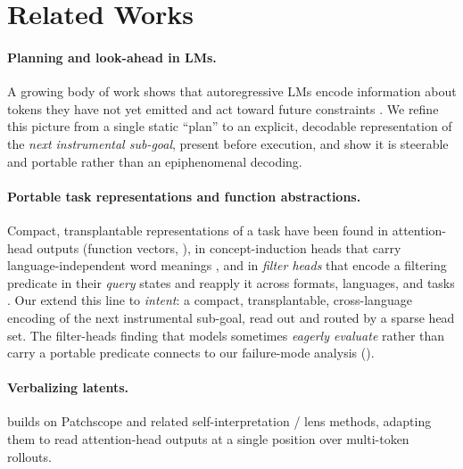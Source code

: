\section{Related Works}
\label{sec:related}

\paragraph{Planning and look-ahead in LMs.} A growing body of work shows that autoregressive LMs
encode information about tokens they have not yet emitted and act toward future constraints
\citep{pal2023futurelens, lindsey2025biology}. We refine this picture from a single static ``plan'' to
an explicit, decodable representation of the \emph{next instrumental sub-goal}, present before
execution, and show it is steerable and portable rather than an epiphenomenal decoding.

\paragraph{Portable task representations and function abstractions.} Compact, transplantable
representations of a task have been found in attention-head outputs (function vectors,
\citealp{todd2024function}), in concept-induction heads that carry language-independent word
meanings \citep{feucht2025dual}, and in \emph{filter heads} that encode a filtering predicate in
their \emph{query} states and reapply it across formats, languages, and tasks
\citep{sensharma2025filterheads}. Our \goalheads extend this line to \emph{intent}: a compact,
transplantable, cross-language encoding of the next instrumental sub-goal, read out and routed by a
sparse head set. The filter-heads finding that models sometimes \emph{eagerly evaluate} rather than
carry a portable predicate connects to our failure-mode analysis ().

\paragraph{Verbalizing latents.} \goalscope builds on Patchscope \citep{ghandeharioun2024patchscope}
and related self-interpretation / lens methods, adapting them to read attention-head outputs at a
single position over multi-token rollouts.

